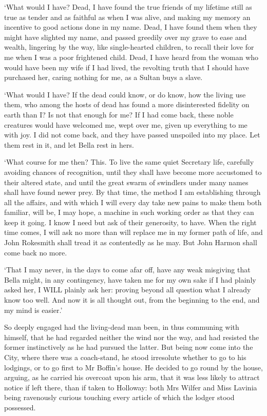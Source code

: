 ‘What would I have? Dead, I have found the true friends of my lifetime
still as true as tender and as faithful as when I was alive, and making
my memory an incentive to good actions done in my name. Dead, I have
found them when they might have slighted my name, and passed
greedily over my grave to ease and wealth, lingering by the way, like
single-hearted children, to recall their love for me when I was a poor
frightened child. Dead, I have heard from the woman who would have been
my wife if I had lived, the revolting truth that I should have purchased
her, caring nothing for me, as a Sultan buys a slave.

‘What would I have? If the dead could know, or do know, how the living
use them, who among the hosts of dead has found a more disinterested
fidelity on earth than I? Is not that enough for me? If I had come back,
these noble creatures would have welcomed me, wept over me, given up
everything to me with joy. I did not come back, and they have passed
unspoiled into my place. Let them rest in it, and let Bella rest in
hers.

‘What course for me then? This. To live the same quiet Secretary life,
carefully avoiding chances of recognition, until they shall have become
more accustomed to their altered state, and until the great swarm of
swindlers under many names shall have found newer prey. By that time,
the method I am establishing through all the affairs, and with which I
will every day take new pains to make them both familiar, will be, I may
hope, a machine in such working order as that they can keep it going.
I know I need but ask of their generosity, to have. When the right time
comes, I will ask no more than will replace me in my former path of
life, and John Rokesmith shall tread it as contentedly as he may. But
John Harmon shall come back no more.

‘That I may never, in the days to come afar off, have any weak misgiving
that Bella might, in any contingency, have taken me for my own sake if
I had plainly asked her, I WILL plainly ask her: proving beyond all
question what I already know too well. And now it is all thought out,
from the beginning to the end, and my mind is easier.’


So deeply engaged had the living-dead man been, in thus communing with
himself, that he had regarded neither the wind nor the way, and had
resisted the former instinctively as he had pursued the latter. But
being now come into the City, where there was a coach-stand, he stood
irresolute whether to go to his lodgings, or to go first to Mr Boffin’s
house. He decided to go round by the house, arguing, as he carried his
overcoat upon his arm, that it was less likely to attract notice if left
there, than if taken to Holloway: both Mrs Wilfer and Miss Lavinia being
ravenously curious touching every article of which the lodger stood
possessed.


